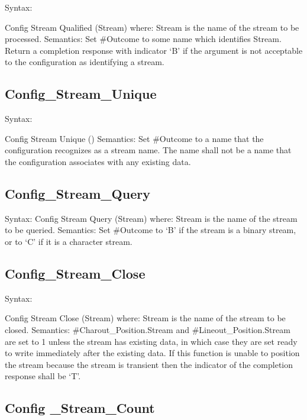 Syntax:

Config Stream Qualified (Stream) where: Stream is the name of the stream
to be processed. Semantics: Set \#Outcome to some name which identifies
Stream. Return a completion response with indicator `B' if the argument
is not acceptable to the configuration as identifying a stream.

\hypertarget{config_stream_unique}{%
\subsection{Config\_Stream\_Unique}\label{config_stream_unique}}

Syntax:

Config Stream Unique () Semantics: Set \#Outcome to a name that the
configuration recognizes as a stream name. The name shall not be a name
that the configuration associates with any existing data.

\hypertarget{config_stream_query}{%
\subsection{Config\_Stream\_Query}\label{config_stream_query}}

Syntax: Config Stream Query (Stream) where: Stream is the name of the
stream to be queried. Semantics: Set \#Outcome to `B' if the stream is a
binary stream, or to `C' if it is a character stream.

\hypertarget{config_stream_close}{%
\subsection{Config\_Stream\_Close}\label{config_stream_close}}

Syntax:

Config Stream Close (Stream) where: Stream is the name of the stream to
be closed. Semantics: \#Charout\_Position.Stream and
\#Lineout\_Position.Stream are set to 1 unless the stream has existing
data, in which case they are set ready to write immediately after the
existing data. If this function is unable to position the stream because
the stream is transient then the indicator of the completion response
shall be `T'.

\hypertarget{config-_stream_count}{%
\subsection{Config \_Stream\_Count}\label{config-_stream_count}}

